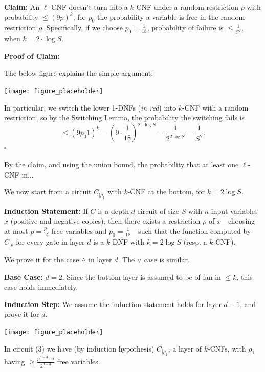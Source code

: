 \textbf{Claim:} An $\ell$-CNF doesn't turn into a $k$-CNF under a random restriction $\rho$ with probability $\leq (9p)^k$, for $p_0$ the probability a variable is free in the random restriction $\rho$. Specifically, if we choose $p_0 = \frac{1}{18}$, probability of failure is $\leq \frac{1}{S^2}$, when $k = 2 \cdot \log S$.

\textbf{Proof of Claim:} 

The below figure explains the simple argument:

\begin{center}
    \texttt{[image: figure\_placeholder]}
\end{center}

In particular, we switch the lower 1-DNFs (\emph{in red}) into $k$-CNF with a random restriction, so by the Switching Lemma, the probability the switching fails is 
\[
\leq (9 p_0 1)^k = (9 \cdot \frac{1}{18})^{2 \cdot \log S} = \frac{1}{2^{2 \log S}} = \frac{1}{S^2}.
\]
\(\square\)

By the claim, and using the union bound, the probability that at least one $\ell$-CNF in...



We now start from a circuit $C_{|\rho_1}$ with $k$-CNF at the bottom, for $k = 2 \log S$.

\textbf{Induction Statement:}  
If $C$ is a depth-$d$ circuit of size $S$ with $n$ input variables  
$x$ (positive and negative copies), then there exists a restriction $\rho$  
of $x$—choosing at most $p = \frac{p_0}{2}$ free variables and $p_0 = \frac{1}{18}$—such that  
the function computed by $C_{|\rho}$ for every gate in layer $d$ is a $k$-DNF  
with $k = 2 \log S$ (resp. a $k$-CNF).  

We prove it for the case $\land$ in layer $d$. The $\lor$ case is similar.  

\textbf{Base Case:} $d = 2$. Since the bottom layer is assumed to be of fan-in $\leq k$,  
this case holds immediately.  

\textbf{Induction Step:}  
We assume the induction statement holds for layer $d-1$, and prove it for $d$.  

\begin{center}
    \texttt{[image: figure\_placeholder]}
\end{center}

In circuit (3) we have (by induction hypothesis) $C_{|\rho_1}$, a layer of $k$-CNFs,  
with $\rho_1$ having $\geq \frac{p_0^{d-3} \cdot n}{2^{d-3}}$ free variables.  

